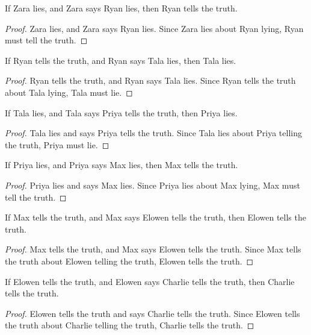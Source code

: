 \begin{tcolorbox}[title=Rewritten Candidate Response, breakable]
\begin{lemma}
\label{lem:ryan_truth}
If Zara lies, and Zara says Ryan lies, then Ryan tells the truth.
\end{lemma}
\begin{proof}
Zara lies, and Zara says Ryan lies.  Since Zara lies about Ryan lying, Ryan must tell the truth.
\end{proof}

\begin{lemma}
\label{lem:tala_lies}
If Ryan tells the truth, and Ryan says Tala lies, then Tala lies.
\end{lemma}
\begin{proof}
Ryan tells the truth, and Ryan says Tala lies.  Since Ryan tells the truth about Tala lying, Tala must lie.
\end{proof}

\begin{lemma}
\label{lem:priya_lies}
If Tala lies, and Tala says Priya tells the truth, then Priya lies.
\end{lemma}
\begin{proof}
Tala lies and says Priya tells the truth.  Since Tala lies about Priya telling the truth, Priya must lie.
\end{proof}

\begin{lemma}
\label{lem:max_truth}
If Priya lies, and Priya says Max lies, then Max tells the truth.
\end{lemma}
\begin{proof}
Priya lies and says Max lies.  Since Priya lies about Max lying, Max must tell the truth.
\end{proof}


\begin{lemma}
\label{lem:elowen_truth}
If Max tells the truth, and Max says Elowen tells the truth, then Elowen tells the truth.
\end{lemma}
\begin{proof}
Max tells the truth, and Max says Elowen tells the truth. Since Max tells the truth about Elowen telling the truth, Elowen tells the truth.
\end{proof}

\begin{lemma}
\label{lem:charlie_truth}
If Elowen tells the truth, and Elowen says Charlie tells the truth, then Charlie tells the truth.
\end{lemma}
\begin{proof}
Elowen tells the truth and says Charlie tells the truth. Since Elowen tells the truth about Charlie telling the truth, Charlie tells the truth.
\end{proof}


\end{tcolorbox}
